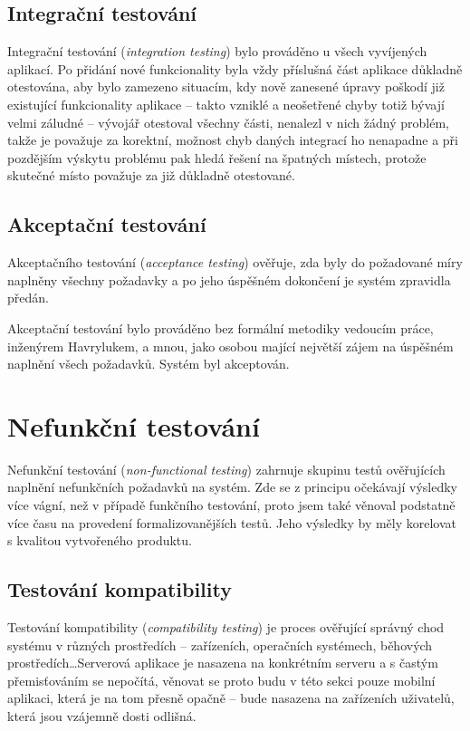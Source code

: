 \subsection{Integrační testování}
Integrační testování (\textit{integration testing}) bylo prováděno u všech vyvíjených aplikací. Po přidání nové funkcionality byla vždy příslušná část aplikace důkladně otestována, aby bylo zamezeno situacím, kdy nově zanesené úpravy poškodí již existující funkcionality aplikace -- takto vzniklé a neošetřené chyby totiž bývají velmi záludné -- vývojář otestoval všechny části, nenalezl v nich žádný problém, takže je považuje za korektní, možnost chyb daných integrací ho nenapadne a při pozdějším výskytu problému pak hledá řešení na špatných místech, protože skutečné místo považuje za již důkladně otestované.

\subsection{Akceptační testování}
Akceptačního testování (\textit{acceptance testing}) ověřuje, zda byly do požadované míry naplněny všechny požadavky a po jeho úspěšném dokončení je systém zpravidla předán.

Akceptační testování bylo prováděno bez formální metodiky vedoucím práce, inženýrem Havrylukem, a mnou, jako osobou mající největší zájem na úspěšném naplnění všech požadavků. Systém byl akceptován.


\section{Nefunkční testování}
Nefunkční testování (\textit{non-functional testing}) zahrnuje skupinu testů ověřujících naplnění nefunkčních požadavků na systém. Zde se z principu očekávají výsledky více vágní, než v případě funkčního testování, proto jsem také věnoval podstatně více času na provedení formalizovanějších testů. Jeho výsledky by měly korelovat s kvalitou vytvořeného produktu.

\subsection{Testování kompatibility}
\label{sec:test:compat}
Testování kompatibility (\textit{compatibility testing}) je proces ověřující správný chod systému v různých prostředích -- zařízeních, operačních systémech, běhových prostředích\dots Serverová aplikace je nasazena na konkrétním serveru a s častým přemisťováním se nepočítá, věnovat se proto budu v této sekci pouze mobilní aplikaci, která je na tom přesně opačně -- bude nasazena na zařízeních uživatelů, která jsou vzájemně dosti odlišná.

